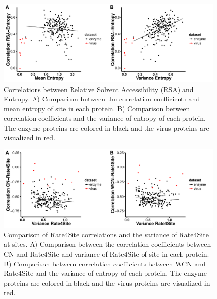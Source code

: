 \documentclass[12pt]{article}
\begin{document}
    \begin{figure}[H]
            \centerline{\includegraphics[width=7.5in]{entropy_rsa_cor.pdf}}     
            \caption{Correlations between Relative Solvent Accessibility (RSA) and Entropy. A) Comparison between the correlation coefficients and mean entropy of site in each protein. B) Comparison between correlation coefficients and the variance of entropy of each protein. The enzyme proteins are colored in black and the virus proteins are visualized in red.}
            \label{fig:entropy_rsa_cor}
    \end{figure}
        
        \begin{figure}[H]
            \centerline{\includegraphics[width=7.5in]{rate_cor.pdf}}     
            \caption{Comparison of Rate4Site correlations and the variance of Rate4Site at sites. A) Comparison between the correlation coefficients between CN and Rate4Site and variance of Rate4Site of site in each protein. B) Comparison between correlation coefficients between WCN and Rate4Site and the variance of entropy of each protein. The enzyme proteins are colored in black and the virus proteins are visualized in red.}
            \label{fig:var_rate_cor}
    \end{figure}
        
\end{document}
